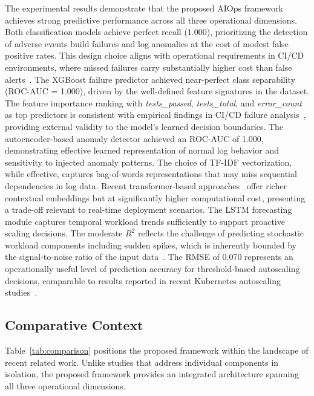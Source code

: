 \documentclass[a4paper,fleqn]{cas-dc}
\begin{document}
The experimental results demonstrate that the proposed AIOps framework achieves strong predictive performance across all three operational dimensions.
Both classification models achieve perfect recall (1.000), prioritizing the detection of adverse events build failures and log anomalies at the cost of modest false positive rates.
This design choice aligns with operational requirements in CI/CD environments, where missed failures carry substantially higher cost than false alerts~\citep{dang2019aiops}.
The XGBoost failure predictor achieved near-perfect class separability (ROC-AUC = 1.000), driven by the well-defined feature signatures in the dataset.
The feature importance ranking with \textit{tests\_passed}, \textit{tests\_total}, and \textit{error\_count} as top predictors is consistent with empirical findings in CI/CD failure analysis~\citep{rausch2017empirical, beller2017oops}, providing external validity to the model's learned decision boundaries.
The autoencoder-based anomaly detector achieved an ROC-AUC of 1.000, demonstrating effective learned representation of normal log behavior and sensitivity to injected anomaly patterns.
The choice of TF-IDF vectorization, while effective, captures bag-of-words representations that may miss sequential dependencies in log data.
Recent transformer-based approaches~\citep{liao2025logtransformer, zhou2024logllm} offer richer contextual embeddings but at significantly higher computational cost, presenting a trade-off relevant to real-time deployment scenarios.
The LSTM forecasting module captures temporal workload trends sufficiently to support proactive scaling decisions.
The moderate $R^2$ reflects the challenge of predicting stochastic workload components including sudden spikes, which is inherently bounded by the signal-to-noise ratio of the input data~\citep{guruge2025prophet}.
The RMSE of 0.070 represents an operationally useful level of prediction accuracy for threshold-based autoscaling decisions, comparable to results reported in recent Kubernetes autoscaling studies~\citep{dasilva2025adaptive}.

\subsection{Comparative Context}\label{subsec:comparison}

Table~\ref{tab:comparison} positions the proposed framework within the landscape of recent related work.
Unlike studies that address individual components in isolation, the proposed framework provides an integrated architecture spanning all three operational dimensions.
\end{document}

